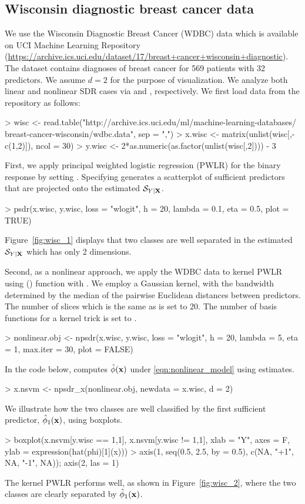 \subsection{Wisconsin diagnostic breast cancer data}
\label{sec:realdata_wisc}
We use the Wisconsin Diagnostic Breast Cancer (WDBC) data which is available on UCI Machine Learning Repository (\url{https://archive.ics.uci.edu/dataset/17/breast+cancer+wisconsin+diagnostic}). The dataset contains diagnoses of breast cancer for 569 patients with 32 predictors. We assume ${d} =2$ for the purpose of visualization. We analyze both linear and nonlinear SDR cases via  and , respectively. We first load data from the repository as follows:
\begin{example}
 > wisc <- read.table("http://archive.ics.uci.edu/ml/machine-learning-databases/
                     breast-cancer-wisconsin/wdbc.data", sep = ",")
 > x.wisc <- matrix(unlist(wisc[,-c(1,2)]), ncol = 30)
 > y.wisc <- 2*as.numeric(as.factor(unlist(wisc[,2]))) - 3
\end{example} 
First, we apply principal weighted logistic regression (PWLR) for the binary response by setting . Specifying  generates a scatterplot of sufficient predictors that are projected onto the estimated $\mathcal{S}_{Y\mid \mathbf{X}}$.
\begin{example}
 > psdr(x.wisc, y.wisc, loss = "wlogit", h = 20, lambda = 0.1, eta = 0.5, plot = TRUE)
\end{example}
Figure~\ref{fig:wisc_1} displays that two classes are well separated in the estimated $\mathcal{S}_{Y\mid \mathbf{X}}$ which has only 2 dimensions.

Second, as a nonlinear approach, we apply the WDBC data to kernel PWLR \citep{shin2017principal} using () function with .
We employ a Gaussian kernel, with the bandwidth determined by the median of the pairwise Euclidean distances between predictors.
The number of slices which is the same as  is set to 20. The number of basis functions for a kernel trick is set to .
\begin{example}
 > nonlinear.obj <- npsdr(x.wisc, y.wisc, loss = "wlogit", h = 20, lambda = 5, eta = 1,
                           max.iter = 30, plot = FALSE)
\end{example}   
In the code below,  computes $\hat\phi(\mathbf{x})$ under \eqref{eqn:nonlinear_model} using  estimates.
\begin{example}
 > x.nsvm <- npsdr_x(nonlinear.obj, newdata = x.wisc, d = 2)
\end{example}   
We illustrate how the two classes are well classified by the first sufficient predictor, $\hat{\phi}_1(\mathbf{x})$, using boxplots.\begin{example} 
 > boxplot(x.nsvm[y.wisc == 1,1], x.nsvm[y.wisc != 1,1], xlab = "Y", axes = F,
          ylab = expression(hat(phi)[1](x)))
 > axis(1, seq(0.5, 2.5, by = 0.5), c(NA, "+1", NA, "-1", NA)); axis(2, las = 1)
\end{example}
The kernel PWLR performs well, as shown in Figure~\ref{fig:wisc_2}, where the two classes are clearly separated by $\hat{\phi}_1(\mathbf{x})$.

